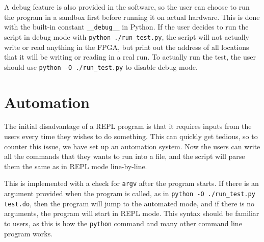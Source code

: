 A debug feature is also provided in the software, so the user can choose to run the program in a sandbox first before running it on actual hardware.
This is done with the built-in constant \texttt{\_\_debug\_\_} in Python.
If the user decides to run the script in debug mode with \texttt{python ./run\_test.py}, the script will not actually write or read anything in the FPGA, but print out the address of all locations that it will be writing or reading in a real run.
To actually run the test, the user should use \texttt{python -O ./run\_test.py} to disable debug mode.

\section{Automation}

The initial disadvantage of a REPL program is that it requires inputs from the users every time they wishes to do something.
This can quickly get tedious, so to counter this issue, we have set up an automation system.
Now the users can write all the commands that they wants to run into a file, and the script will parse them the same as in REPL mode line-by-line.

This is implemented with a check for \texttt{argv} after the program starts.
If there is an argument provided when the program is called, as in \texttt{python -O ./run\_test.py test.do}, then the program will jump to the automated mode, and if there is no arguments, the program will start in REPL mode.
This syntax should be familiar to users, as this is how the \texttt{python} command and many other command line program works.
